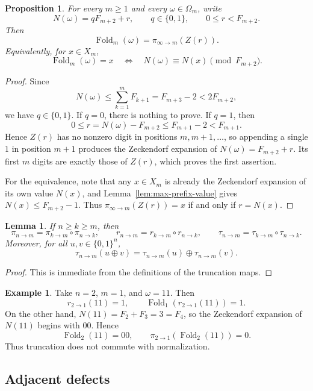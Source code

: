 \documentclass[11pt,reqno]{amsart}
\numberwithin{equation}{section}
\theoremstyle{plain}
\newtheorem{lemma}[theorem]{Lemma}
\newtheorem{proposition}[theorem]{Proposition}
\theoremstyle{definition}
\newtheorem{example}[theorem]{Example}
\theoremstyle{remark}
\DeclareMathOperator{\Fold}{Fold}
\begin{document}
\begin{proposition}
\label{prop:fold-residue}
For every $m\ge 1$ and every $\omega\in\Omega_m$, write
\[
N(\omega)=qF_{m+2}+r,
\qquad
q\in\{0,1\},
\qquad
0\le r<F_{m+2}.
\]
Then
\[
\Fold_m(\omega)=\pi_{\infty\to m}(Z(r)).
\]
Equivalently, for $x\in X_m$,
\[
\Fold_m(\omega)=x
\quad\Longleftrightarrow\quad
N(\omega)\equiv N(x)\pmod{F_{m+2}}.
\]
\end{proposition}

\begin{proof}
Since
\[
N(\omega)\le \sum_{k=1}^mF_{k+1}=F_{m+3}-2<2F_{m+2},
\]
we have $q\in\{0,1\}$.  If $q=0$, there is nothing to prove.  If $q=1$, then
\[
0\le r=N(\omega)-F_{m+2}\le F_{m+1}-2<F_{m+1}.
\]
Hence $Z(r)$ has no nonzero digit in positions $m,m+1,\dots$, so appending a
single $1$ in position $m+1$ produces the Zeckendorf expansion of
$N(\omega)=F_{m+2}+r$.  Its first $m$ digits are exactly those of $Z(r)$,
which proves the first assertion.

For the equivalence, note that any $x\in X_m$ is already the Zeckendorf
expansion of its own value $N(x)$, and Lemma~\ref{lem:max-prefix-value} gives
$N(x)\le F_{m+2}-1$.  Thus $\pi_{\infty\to m}(Z(r))=x$ if and only if
$r=N(x)$.
\end{proof}

\begin{lemma}
\label{lem:prefix-functoriality}
If $n\ge k\ge m$, then
\[
\pi_{n\to m}=\pi_{k\to m}\circ \pi_{n\to k},
\qquad
r_{n\to m}=r_{k\to m}\circ r_{n\to k},
\qquad
\tau_{n\to m}=\tau_{k\to m}\circ \tau_{n\to k}.
\]
Moreover, for all $u,v\in\{0,1\}^n$,
\[
\tau_{n\to m}(u\oplus v)=\tau_{n\to m}(u)\oplus\tau_{n\to m}(v).
\]
\end{lemma}

\begin{proof}
This is immediate from the definitions of the truncation maps.
\end{proof}

\begin{example}
\label{ex:noncommuting-square}
Take $n=2$, $m=1$, and $\omega=11$.  Then
\[
r_{2\to 1}(11)=1,
\qquad
\Fold_1(r_{2\to 1}(11))=1.
\]
On the other hand, $N(11)=F_2+F_3=3=F_4$, so the Zeckendorf expansion of
$N(11)$ begins with $00$.  Hence
\[
\Fold_2(11)=00,
\qquad
\pi_{2\to 1}(\Fold_2(11))=0.
\]
Thus truncation does not commute with normalization.
\end{example}

\subsection{Adjacent defects}
\end{document}
